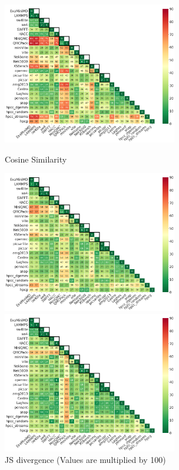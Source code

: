 \begin{figure}[htbp]
\centering
	\begin{minipage}[t]{0.48\textwidth}
	\centering
	\includegraphics[width=3in]{figs/Cosine_origin_color_tri20.png}
	\vspace*{-5mm}
	\caption{Cosine Similarity}
	\label{figs:Cosine}
	\end{minipage}
\hspace{.1in}
\begin{minipage}[t]{0.48\textwidth}
	\centering
	\includegraphics[width=3in]{figs/JS-divergence_m100.png}
	\vspace*{-5mm}
	\caption{JS divergence (Values are multiplied by 100)}
	\label{figs:JS}
	\end{minipage}
\hspace{.1in}
\begin{minipage}[t]{0.48\textwidth}
	\centering
	\includegraphics[width=3in]{figs/Wasserstein distance_m1000.png}

\end{minipage}
\end{figure}

